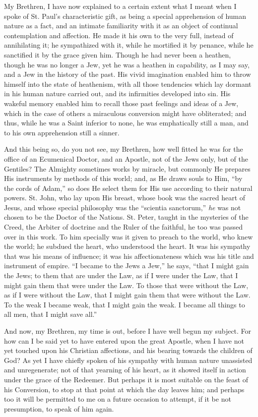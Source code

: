 My Brethren, I have now explained to a certain extent
what I meant when I spoke of St. Paul's characteristic
gift, as being a special apprehension of human nature as
a fact, and an intimate familiarity with it as an object
of continual contemplation and affection. He made it his
own to the very full, instead of annihilating it; he
sympathized with it, while he mortified it by penance,
while he sanctified it by the grace given him. Though he
had never been a heathen, though he was no longer a Jew,
yet he was a heathen in capability, as I may say, and a
Jew in the history of the past. His vivid imagination
enabled him to throw himself into the state of heathenism, with all those tendencies which lay dormant
in his human nature carried out, and its infirmities
developed into sin. His wakeful memory enabled him to
recall those past feelings and ideas of a Jew, which in
the case of others a miraculous conversion might have
obliterated; and thus, while he was a Saint inferior to
none, he was emphatically still a man, and to his own
apprehension still a sinner.

And this being so, do you not see, my Brethren, how
well fitted he was for the office of an Ecumenical
Doctor, and an Apostle, not of the Jews only, but of the
Gentiles? The Almighty sometimes works by miracle, but
commonly He prepares His instruments by methods of this
world; and, as He draws souls to Him, ``by the cords
of Adam,'' so does He select them for His use
according to their natural powers. St. John, who lay upon
His breast, whose book was the sacred heart of Jesus, and
whose special philosophy was the ``scientia
sanctorum,'' \emph{he} was not chosen to be the
Doctor of the Nations. St. Peter, taught in the mysteries
of the Creed, the Arbiter of doctrine and the Ruler of
the faithful, he too was passed over in this work. To him
specially was it given to preach to the world, who knew
the world; he subdued the heart, who understood the
heart. It was his sympathy that was his means of
influence; it was his affectionateness which was his
title and instrument of empire. ``I became to the
Jews a Jew,'' he says, ``that I might gain the
Jews; to them that are under the Law, as if I were under
the Law, that I might gain them that were under the Law.
To those that were without the Law, as if I were without the Law, that I might gain them that were without the Law. To the weak I became weak, that I might gain the
weak. I became all things to all men, that I might save
all.''

And now, my Brethren, my time is out, before I have
well begun my subject. For how can I be said yet to have
entered upon the great Apostle, when I have not yet
touched upon his Christian affections, and his bearing
towards the children of God? As yet I have chiefly spoken
of his sympathy with human nature unassisted and
unregenerate; not of that yearning of his heart, as it
showed itself in action under the grace of the Redeemer.
But perhaps it is most suitable on the feast of his
Conversion, to stop at that point at which the day leaves
him; and perhaps too it will be permitted to me on a
future occasion to attempt, if it be not presumption, to
speak of him again.

